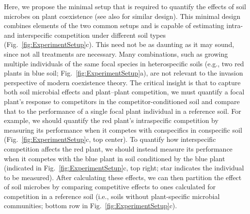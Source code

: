 Here, we propose the minimal setup that is required to quantify the effects of soil microbes on plant coexistence (see also \citealt{Hart2018} for similar design).
This minimal design combines elements of the two common setups and is capable of estimating intra- and interspecific competition under different soil types (Fig.~\ref{fig:ExperimentSetup}c).
This need not be as daunting as it may sound, since not all treatments are necessary. Many combinations, such as growing multiple individuals of the same focal species in heterospecific soils (e.g., two red plants in blue soil; Fig.~\ref{fig:ExperimentSetup}a), are not relevant to the invasion perspective of modern coexistence theory.
The critical insight is that to capture both soil microbial effects and plant--plant competition, we must quantify a focal plant's response to competitors in the competitor-conditioned soil and compare that to the performance of a single focal plant individual in a reference soil.
For example, we should quantify the red plant's intraspecific competition by measuring its performance when it competes with conspecifics in conspecific soil (Fig.~\ref{fig:ExperimentSetup}c, top center). To quantify how interspecific competition affects the red plant, we should instead measure its performance when it competes with the blue plant in soil conditioned by the blue plant (indicated in Fig.~\ref{fig:ExperimentSetup}c, top right; star indicates the individual to be measured).
After calculating these effects, we can then partition the effect of soil microbes by comparing competitive effects to ones calculated for competition in a reference soil (i.e., soils without plant-specific microbial communities; bottom row in Fig.~\ref{fig:ExperimentSetup}c).
\par


